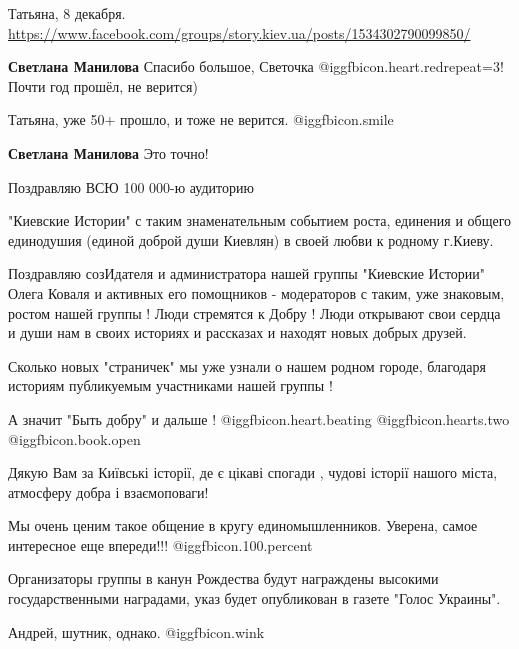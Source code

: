 \begin{itemize}
\begin{itemize} %
Татьяна, 8 декабря. \url{https://www.facebook.com/groups/story.kiev.ua/posts/1534302790099850/}

\begin{itemize} %
\textbf{Светлана Манилова} Спасибо большое, Светочка @igg{fbicon.heart.red}{repeat=3}! Почти год прошёл, не верится)

Татьяна, уже 50+ прошло, и тоже не верится. @igg{fbicon.smile} 

\textbf{Светлана Манилова} Это точно!
\end{itemize} %

\end{itemize} %


Поздравляю ВСЮ 100 000-ю аудиторию

"Киевские Истории" с таким знаменательным событием роста, единения и общего
единодушия (единой доброй души Киевлян) в своей любви к родному г.Киеву.

Поздравляю созИдателя и администратора нашей группы "Киевские Истории" Олега
Коваля и активных его помощников - модераторов с таким, уже знаковым, ростом
нашей группы ! Люди стремятся к Добру ! Люди открывают свои сердца и души нам в
своих историях и рассказах и находят новых добрых друзей.

Сколько новых "страничек" мы уже узнали о нашем родном городе, благодаря
историям публикуемым участниками нашей группы !

А значит "Быть добру" и дальше !  @igg{fbicon.heart.beating}  @igg{fbicon.hearts.two}  @igg{fbicon.book.open} 

Дякую Вам за Київські історії, де є цікаві спогади , чудові історії нашого міста, атмосферу добра і взаємоповаги!

Мы очень ценим такое общение в кругу единомышленников. Уверена, самое интересное еще впереди!!! @igg{fbicon.100.percent} 


Организаторы группы в канун Рождества будут награждены высокими
государственными наградами, указ будет опубликован в газете "Голос Украины".

\begin{itemize} %
Андрей, шутник, однако. @igg{fbicon.wink} 


\end{itemize}
\end{itemize}
